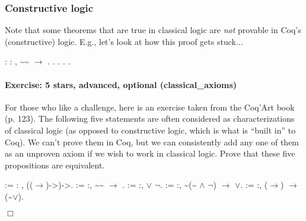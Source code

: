 \documentclass[12pt]{report}
\begin{document}
\subsubsection{Constructive logic}

 Note that some theorems that are true in classical logic are \textit{not}
    provable in Coq's (constructive) logic.  E.g., let's look at how
    this proof gets stuck... \begin{coqdoccode}
\coqdocemptyline
\coqdocnoindent
{}  : \coqdockw{\ensuremath{\forall}}  : ,\coqdoceol
\coqdocindent{1.00em}
\~{}\~{} \ensuremath{\rightarrow} .\coqdoceol
\coqdocnoindent
{}.\coqdoceol
\coqdocindent{1.00em}
  .    .\coqdoceol
\coqdocindent{1.00em}
.\coqdoceol
\coqdocemptyline
\end{coqdoccode}
\paragraph{Exercise: 5 stars, advanced, optional (classical\_axioms)}

 For those who like a challenge, here is an exercise
    taken from the Coq'Art book (p. 123).  The following five
    statements are often considered as characterizations of
    classical logic (as opposed to constructive logic, which is
    what is ``built in'' to Coq).  We can't prove them in Coq, but
    we can consistently add any one of them as an unproven axiom
    if we wish to work in classical logic.  Prove that these five
    propositions are equivalent. \begin{coqdoccode}
\coqdocemptyline
\coqdocnoindent
{}  := \coqdockw{\ensuremath{\forall}}  : , \coqdoceol
\coqdocindent{1.00em}
((\ensuremath{\rightarrow})->)->.\coqdoceol
\coqdocnoindent
{}  := \coqdockw{\ensuremath{\forall}} :, \coqdoceol
\coqdocindent{1.00em}
\~{}\~{} \ensuremath{\rightarrow} .\coqdoceol
\coqdocnoindent
{}  := \coqdockw{\ensuremath{\forall}} :, \coqdoceol
\coqdocindent{1.00em}
 \ensuremath{\lor} \ensuremath{\lnot}.\coqdoceol
\coqdocnoindent
{}  := \coqdockw{\ensuremath{\forall}}  :, \coqdoceol
\coqdocindent{1.00em}
\~{}(\~{} \ensuremath{\land} \ensuremath{\lnot}) \ensuremath{\rightarrow} \ensuremath{\lor}.\coqdoceol
\coqdocnoindent
{}  := \coqdockw{\ensuremath{\forall}}  :, \coqdoceol
\coqdocindent{1.00em}
(\ensuremath{\rightarrow}) \ensuremath{\rightarrow} (\~{}\ensuremath{\lor}).\coqdoceol
\coqdocemptyline
\end{coqdoccode}
\ensuremath{\Box} 
\end{document}
